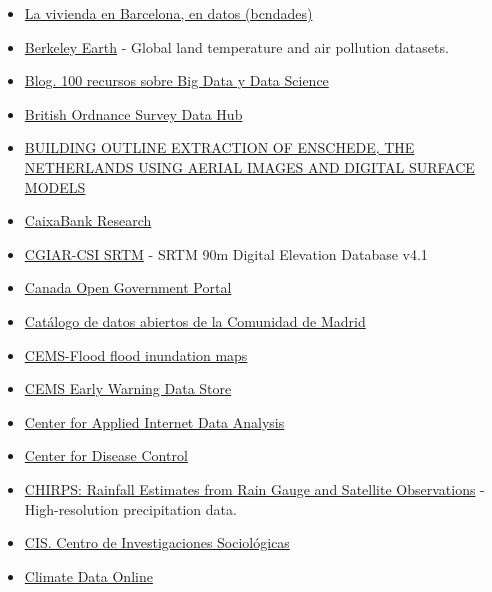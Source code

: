 \documentclass[
  letterpaper,
  DIV=11,
  numbers=noendperiod]{scrartcl}
\begin{document}
\begin{itemize}
  \href{https://datos.gob.es/es/catalogo/l01280796-censo-de-locales-sus-actividades-y-terrazas-de-hosteleria-y-restauracion}{Ayuntamiento
  de Madrid. Censo de locales, sus actividades y terrazas de hostelería
  y restauración}
\item
  \href{https://bcndades.cat/vivienda-en-barcelona/}{La vivienda en
  Barcelona, en datos (bcndades)}
\item
  \href{https://berkeleyearth.org/data/}{Berkeley Earth} - Global land
  temperature and air pollution datasets.
\item
  \href{https://www.todobi.com/mas-de-100-recursos-sobre-big-data-y/}{Blog.
  100 recursos sobre Big Data y Data Science}
\item
  \href{https://osdatahub.os.uk/}{British Ordnance Survey Data Hub}
\item
  \href{https://easy.dans.knaw.nl/ui/datasets/id/easy-dataset:257588}{BUILDING
  OUTLINE EXTRACTION OF ENSCHEDE, THE NETHERLANDS USING AERIAL IMAGES
  AND DIGITAL SURFACE MODELS}
\item
  \href{https://www.caixabankresearch.com/es}{CaixaBank Research}
\item
  \href{https://csidotinfo.wordpress.com/data/srtm-90m-digital-elevation-database-v4-1/}{CGIAR-CSI
  SRTM} - SRTM 90m Digital Elevation Database v4.1
\item
  \href{https://open.canada.ca/data/en/dataset?q=education}{Canada Open
  Government Portal}
\item
  \href{https://datos.comunidad.madrid/catalogos/\#/search?page=0&limit=20&order=date}{Catálogo
  de datos abiertos de la Comunidad de Madrid}
\item
  \href{https://confluence.ecmwf.int/display/CEMS/CEMS-Flood+flood+inundation+maps}{CEMS-Flood
  flood inundation maps}
\item
  \href{https://ewds.climate.copernicus.eu/}{CEMS Early Warning Data
  Store}
\item
  \href{https://www.caida.org/data/overview/}{Center for Applied
  Internet Data Analysis}
\item
  \href{https://wonder.cdc.gov/}{Center for Disease Control}
\item
  \href{https://www.chc.ucsb.edu/data/chirps}{CHIRPS: Rainfall Estimates
  from Rain Gauge and Satellite Observations} - High-resolution
  precipitation data.
\item
  \href{https://www.cis.es/inicio}{CIS. Centro de Investigaciones
  Sociológicas}
\item
  \href{https://www.ncdc.noaa.gov/cdo-web/}{Climate Data Online}

\end{itemize}
\end{document}

